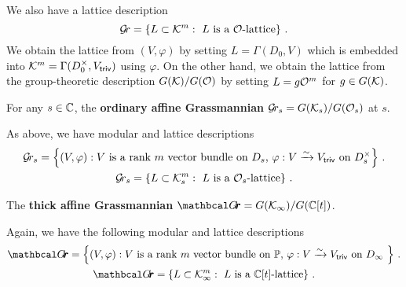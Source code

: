 \documentclass[draft]{article}
\begin{document}
    We also have a lattice description 
    $$ 
    \mathcal{G}\!r = \left\{ L \subset \mathcal K^m : \text{ $L$ is a $\mathcal O$-lattice} \right\}\,.
    $$
    We obtain the lattice from $ (V,\varphi) $ by setting $ L = \Gamma(D_0, V)$ which is embedded into $ \mathcal K^m = \Gamma(D_0^\times, V_{\sf triv})$ using $ \varphi$.  On the other hand, we obtain the lattice from the group-theoretic description $ G(\mathcal K) / G(\mathcal O) $ by setting $ L = g \mathcal O^m$ for $ g \in G(\mathcal K)$.
\begin{definition}
 For any $ s \in \mathbb C $, 
    the \textbf{ordinary affine Grassmannian} $\mathcal{G}\!r_s = G(\mathcal K_s)/G(\mathcal O_s)$ at $ s $. 
\end{definition}    
As above, we have modular and lattice descriptions
\begin{gather*}
    \mathcal{G}\!r_s = 
    \left\{ (V, \varphi) : \text{$V$ is a rank $m$ vector bundle on $ D_s $, $\varphi : V \xrightarrow{\sim} V_{\sf triv} $ on $ D^\times_s $} \right\}\,. \\
    \mathcal{G}\!r_s = \left\{ L \subset \mathcal K_s^m : \text{ $L$ is a $\mathcal O_s$-lattice} \right\} \,. 
\end{gather*}

\begin{definition}
The \textbf{thick affine Grassmannian} $\Grth = G(\Kinf)/G(\CC[t])$.
\end{definition}
    Again, we have the following modular and lattice descriptions
    \begin{gather*}
         \Grth = 
         \left\{ (V, \varphi) : \text{$V$ is a rank $m$ vector bundle on $ \PP $, $\varphi : V \xrightarrow{\sim} \Vtriv $ on $ D_\infty $ } \right\}\,. \\
    \Grth = \left\{ L \subset  \Kinf^m : \text{ $L$ is a $\CC[t]$-lattice} \right\}\,.
    \end{gather*}
\end{document}
